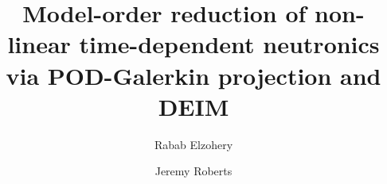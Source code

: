 \documentclass[review,number,sort&compress,12pt]{elsarticle}
\begin{document}
% 
\begin{frontmatter}


\title{Model-order reduction of non-linear time-dependent neutronics via POD-Galerkin projection and DEIM}
\author[focal]{Rabab Elzohery}
\author{Jeremy Roberts}
\address {The Alan Levin Department of Mechanical and Nuclear Engineering,
	Kansas State University \\
	3002 Rathbone Hall, Manhattan, KS 66506, US \\ rababelzohery@ksu.edu, jaroberts@ksu.edu}



\end{frontmatter}
\end{document}
